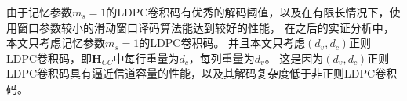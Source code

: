 \begin{center}
\def\linkdoub{\draw [double distance=1mm, very thick] (0,0)--}
\def\linksing{\draw [very thick] (0,0)--}
\def\check{%
    \filldraw [fill=white,very thick] (0,0) circle (5pt);
    \draw [very thick] (0,3.5pt)--(0,-3.5pt);
    \draw [very thick] (3.5pt,0)--(-3.5pt,0);
}
\def\bit{%
    \filldraw [fill=white,very thick] (0,0) circle (5pt);
    \draw [very thick] (-3.2pt,2.2pt)--(3.2pt,2.2pt);
    \draw [very thick] (-3.2pt,-2.2pt)--(3.2pt,-2.2pt);
}
\def\thetaone{90}
\def\thetatwo{-90}
\def\thetathree{60}
\def\thetafour{-60}
\def\armLength{0.9}
\def\symbolDist{1}
\label{fig:LDPCCC}
\end{center}

由于记忆参数$m_s=1$的LDPC卷积码有优秀的解码阈值，以及在有限长情况下，使用窗口参数较小的滑动窗口译码算法能达到较好的性能，
在之后的实证分析中，本文只考虑记忆参数$m_s=1$的LDPC卷积码。
并且本文只考虑$(d_v,d_c)$正则LDPC卷积码，即$\mathbf{H}_{CC}$中每行重量为$d_c$，每列重量为$d_v$。
这是因为$(d_v,d_c)$正则LDPC卷积码具有逼近信道容量的性能，以及其解码复杂度低于非正则LDPC卷积码。

